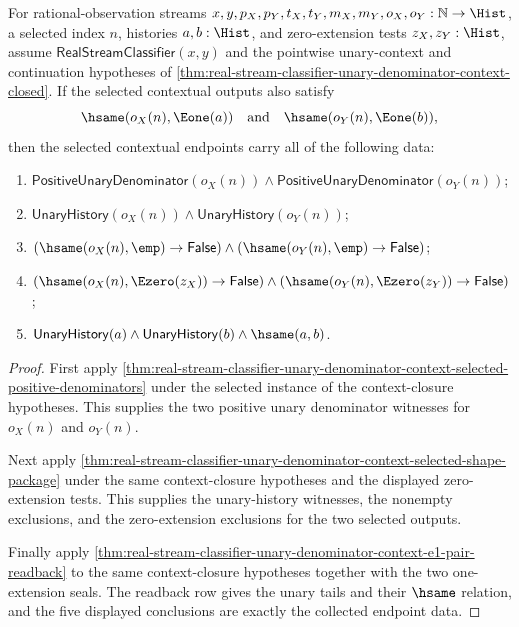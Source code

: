 \begin{theorem}
\label{thm:real-stream-classifier-unary-denominator-context-selected-full-endpoint-package}
For rational-observation streams
$x,y,p_X,p_Y,t_X,t_Y,m_X,m_Y,o_X,o_Y:\mathbb{N}\to\Hist$, a selected
index $n$, histories $a,b:\Hist$, and zero-extension tests $z_X,z_Y:\Hist$,
assume $\mathsf{RealStreamClassifier}(x,y)$ and the pointwise unary-context
and continuation hypotheses of
\autoref{thm:real-stream-classifier-unary-denominator-context-closed}. If the
selected contextual outputs also satisfy
$$
\hsame(o_X(n),\Eone(a))\quad\text{and}\quad \hsame(o_Y(n),\Eone(b)),
$$
then the selected contextual endpoints carry all of the following data:
\begin{enumerate}
\item $\mathsf{PositiveUnaryDenominator}(o_X(n))\land
\mathsf{PositiveUnaryDenominator}(o_Y(n))$;
\item $\mathsf{UnaryHistory}(o_X(n))\land \mathsf{UnaryHistory}(o_Y(n))$;
\item $(\hsame(o_X(n),\emp)\to\mathsf{False})\land
(\hsame(o_Y(n),\emp)\to\mathsf{False})$;
\item $(\hsame(o_X(n),\Ezero(z_X))\to\mathsf{False})\land
(\hsame(o_Y(n),\Ezero(z_Y))\to\mathsf{False})$;
\item $\mathsf{UnaryHistory}(a)\land\mathsf{UnaryHistory}(b)\land\hsame(a,b)$.
\end{enumerate}
\end{theorem}
\begin{proof}
First apply
\autoref{thm:real-stream-classifier-unary-denominator-context-selected-positive-denominators}
under the selected instance of the context-closure hypotheses. This supplies
the two positive unary denominator witnesses for $o_X(n)$ and $o_Y(n)$.

Next apply
\autoref{thm:real-stream-classifier-unary-denominator-context-selected-shape-package}
under the same context-closure hypotheses and the displayed zero-extension
tests. This supplies the unary-history witnesses, the nonempty exclusions, and
the zero-extension exclusions for the two selected outputs.

Finally apply
\autoref{thm:real-stream-classifier-unary-denominator-context-e1-pair-readback}
to the same context-closure hypotheses together with the two one-extension
seals. The readback row gives the unary tails and their $\hsame$ relation, and
the five displayed conclusions are exactly the collected endpoint data.
\end{proof}
